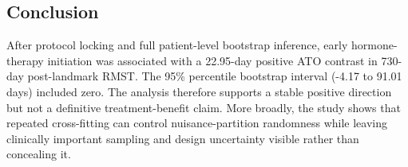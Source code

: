 \subsection{Conclusion}

After protocol locking and full patient-level bootstrap inference, early hormone-therapy initiation was associated with a 22.95-day positive ATO contrast in 730-day post-landmark RMST. The 95\% percentile bootstrap interval (-4.17 to 91.01 days) included zero. The analysis therefore supports a stable positive direction but not a definitive treatment-benefit claim. More broadly, the study shows that repeated cross-fitting can control nuisance-partition randomness while leaving clinically important sampling and design uncertainty visible rather than concealing it.
